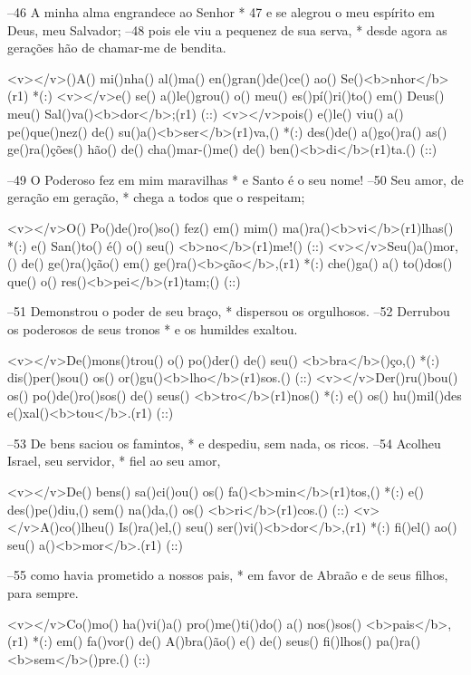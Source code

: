 –46 A minha alma engrandece ao Senhor *
47 e se alegrou o meu espírito em Deus, meu Salvador;
–48 pois ele viu a pequenez de sua serva, *
desde agora as gerações hão de chamar-me de bendita.

<v></v>()A() mi()nha() al()ma() en()gran()de()ce() ao() Se()<b>nhor</b>(r1) *(:)
<v></v>e() se() a()le()grou() o() meu() es()pí()ri()to() em() Deus() meu() Sal()va()<b>dor</b>;(r1) (::)
<v></v>pois() e()le() viu() a() pe()que()nez() de() su()a()<b>ser</b>(r1)va,() *(:)
des()de() a()go()ra() as() ge()ra()ções() hão() de() cha()mar-()me() de() ben()<b>di</b>(r1)ta.() (::)

–49 O Poderoso fez em mim maravilhas *
e Santo é o seu nome!
–50 Seu amor, de geração em geração, *
chega a todos que o respeitam;

<v></v>O() Po()de()ro()so() fez() em() mim() ma()ra()<b>vi</b>(r1)lhas() *(:)
e() San()to() é() o() seu() <b>no</b>(r1)me!() (::)
<v></v>Seu()a()mor,() de() ge()ra()ção() em() ge()ra()<b>ção</b>,(r1) *(:)
che()ga() a() to()dos() que() o() res()<b>pei</b>(r1)tam;() (::)

–51 Demonstrou o poder de seu braço, *
dispersou os orgulhosos.
–52 Derrubou os poderosos de seus tronos *
e os humildes exaltou.

<v></v>De()mons()trou() o() po()der() de() seu() <b>bra</b>()ço,() *(:)
dis()per()sou() os() or()gu()<b>lho</b>(r1)sos.() (::)
<v></v>Der()ru()bou() os() po()de()ro()sos() de() seus() <b>tro</b>(r1)nos() *(:)
e() os() hu()mil()des e()xal()<b>tou</b>.(r1) (::)

–53 De bens saciou os famintos, *
e despediu, sem nada, os ricos.
–54 Acolheu Israel, seu servidor, *
fiel ao seu amor,

<v></v>De() bens() sa()ci()ou() os() fa()<b>min</b>(r1)tos,() *(:)
e() des()pe()diu,() sem() na()da,() os() <b>ri</b>(r1)cos.() (::)
<v></v>A()co()lheu() Is()ra()el,() seu() ser()vi()<b>dor</b>,(r1) *(:)
fi()el() ao() seu() a()<b>mor</b>.(r1) (::)

–55 como havia prometido a nossos pais, *
em favor de Abraão e de seus filhos, para sempre. 

<v></v>Co()mo() ha()vi()a() pro()me()ti()do() a() nos()sos() <b>pais</b>,(r1) *(:)
em() fa()vor() de() A()bra()ão() e() de() seus() fi()lhos() pa()ra() <b>sem</b>()pre.() (::)